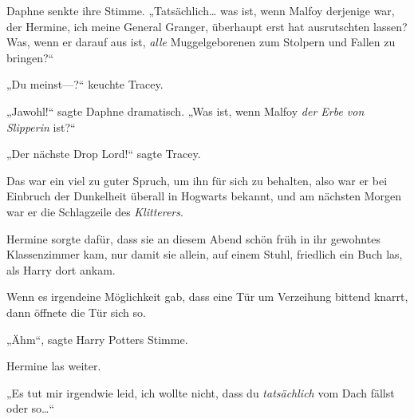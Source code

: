Daphne senkte ihre Stimme. „Tatsächlich… was ist, wenn Malfoy derjenige war, der Hermine, ich meine General Granger, überhaupt erst hat ausrutschten lassen? Was, wenn er darauf aus ist, \emph{alle} Muggelgeborenen zum Stolpern und Fallen zu bringen?“

„Du meinst—?“ keuchte Tracey.

„Jawohl!“ sagte Daphne dramatisch. „Was ist, wenn Malfoy \emph{der Erbe von} \emph{Slipperin} ist?“%

„Der nächste Drop Lord!“%
sagte Tracey.

Das war ein viel zu guter Spruch, um ihn für sich zu behalten, also war er bei Einbruch der Dunkelheit überall in Hogwarts bekannt, und am nächsten Morgen war er die Schlagzeile des \emph{Klitterers}.


Hermine sorgte dafür, dass sie an diesem Abend schön früh in ihr gewohntes Klassenzimmer kam, nur damit sie allein, auf einem Stuhl, friedlich ein Buch las, als Harry dort ankam.

Wenn es irgendeine Möglichkeit gab, dass eine Tür um Verzeihung bittend knarrt, dann öffnete die Tür sich so.

„Ähm“, sagte Harry Potters Stimme.

Hermine las weiter.

„Es tut mir irgendwie leid, ich wollte nicht, dass du \emph{tatsächlich} vom Dach fällst oder so…“

